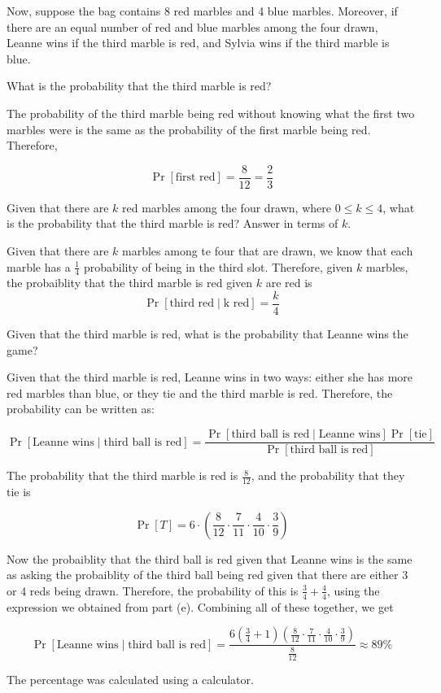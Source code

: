 \documentclass[11pt]{article}
\begin{document}
Now, suppose the bag contains 8 red marbles and 4 blue marbles. Moreover, if there are an equal number of red and blue marbles among the four drawn, Leanne wins if the third marble is red, and Sylvia wins if the third marble is blue. 
\begin{ResumeParts}
    \Part What is the probability that the third marble is red?

    \begin{solution}
        The probability of the third marble being red without knowing what the first two marbles were is the same as the probability of the first marble being red. Therefore, 

        \[ \Pr[\text{first red}] = \frac{8}{12} = \frac 23\]
    \end{solution}   
    \Part Given that there are $k$ red marbles among the four drawn, where $0 \leq k \leq 4$, what is the probability that the third marble is red? Answer in terms of $k$.

    \begin{solution}
        Given that there are $k$ marbles among te four that are drawn, we know that each marble has a $\frac 14$ probability of being in the third slot. Therefore, given $k$ marbles, the probaiblity that the third marble is red given $k$ are red is 
        \[ \Pr[\text{third red} \mid \text{k red}] = \frac k4\] 
    \end{solution}
    
    \Part Given that the third marble is red, what is the probability that Leanne wins the game?

    \begin{solution}
        Given that the third marble is red, Leanne wins in two ways: either she has more red marbles than blue, or they tie and the third marble is red. Therefore, the probability can be written as: 

        \[ \Pr[\text{Leanne wins} \mid \text{third ball is red}] = \frac{\Pr[\text{third ball is red}\mid \text{Leanne wins}] \Pr[\text{tie}]}{\Pr[\text{third ball is red}]}\] 

        The probability that the third marble is red is $\frac{8}{12}$, and the probability that they tie is

        \[ \Pr[T] =  6 \cdot \left(\frac{8}{12} \cdot \frac{7}{11} \cdot \frac{4}{10} \cdot \frac39\right)\]

        Now the probaiblity that the third ball is red given that Leanne wins is the same as asking the probaiblity of the third ball being red given that there are either 3 or 4 reds being drawn. Therefore, the probability of this is $\frac{3}{4} + \frac 44$, using the expression we obtained from part (e). Combining all of these together, we get 

        \[ \Pr[\text{Leanne wins} \mid \text{third ball is red}] = \frac{6 \left(\frac 34 + 1\right)\left(\frac{8}{12} \cdot \frac{7}{11} \cdot \frac{4}{10} \cdot \frac39\right)}{\frac{8}{12}} \approx 89\%\]

        The percentage was calculated using a calculator.


    \end{solution}
    
\end{ResumeParts}
\end{document}

